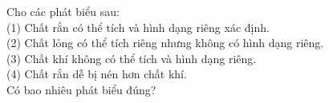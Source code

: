 \begin{bt}
	{\color{red}\footnotesize\ttfamily [L12C1B1-TLN-4]}\par %
	Cho các phát biểu sau:\\
	(1) Chất rắn có thể tích và hình dạng riêng xác định.\\
	(2) Chất lỏng có thể tích riêng nhưng không có hình dạng riêng.\\
	(3) Chất khí không có thể tích và hình dạng riêng.\\
	(4) Chất rắn dễ bị nén hơn chất khí.\\
	Có bao nhiêu phát biểu đúng?
\end{bt}

